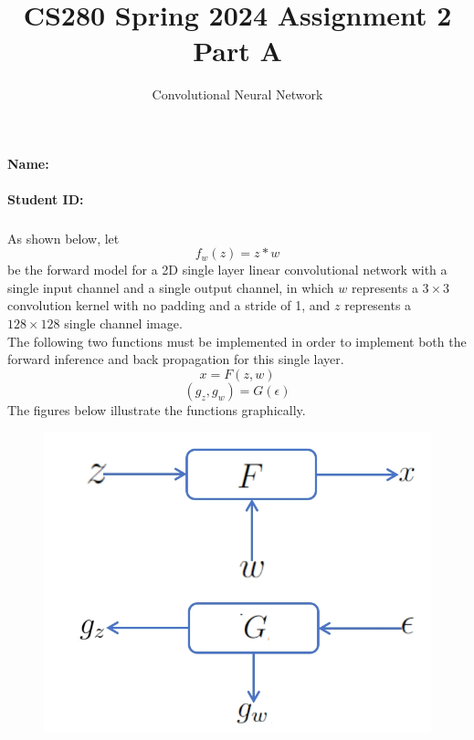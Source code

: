 \documentclass[12pt]{article}%
\begin{document}
\title{CS280 Spring 2024 Assignment 2 \\ Part A}
\author{Convolutional Neural Network}
\maketitle

\paragraph{Name:}

\paragraph{Student ID:}

\newpage


\subsubsection*{}
As shown below, let $$f_w(z)=z*w$$ be the forward model for a 2D single 
layer linear convolutional network with a single input channel and a single 
output channel, in which $w$ represents a 
$3\times3$ convolution kernel with no padding and a stride of 1, and 
$z$ represents a $128\times128$ single channel image. \\
The following two functions must be implemented in order to implement 
both the forward inference and back propagation for this single layer.
$$x = F(z, w)$$
$$(g_z, g_w) = G(\epsilon)$$
The figures below illustrate the functions graphically.
\begin{figure}[htbp]
    \centering
    \includegraphics*[scale=0.3]{example.png}
\end{figure}
\end{document}
